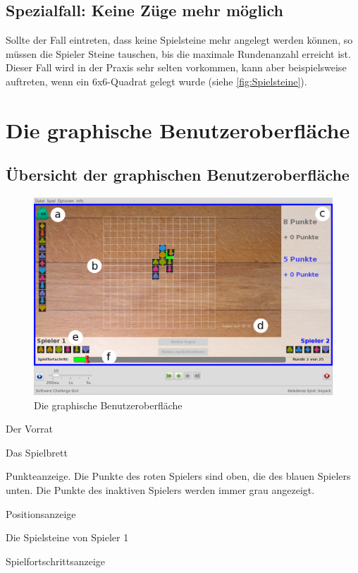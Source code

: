 \documentclass[a4paper, ngerman]{scrartcl}
\begin{document}
\subsection{Spezialfall: Keine Züge mehr möglich}
Sollte der Fall eintreten, dass keine Spielsteine mehr angelegt werden können, so müssen die Spieler Steine tauschen, bis die maximale Rundenanzahl erreicht ist. Dieser Fall wird in der Praxis sehr selten vorkommen, kann aber beispielsweise auftreten, wenn ein 6x6-Quadrat gelegt wurde (siehe \autoref{fig:Spielsteine}).
\newpage
	
\section{Die graphische Benutzeroberfläche}
\subsection{Übersicht der graphischen Benutzeroberfläche}
\begin{figure}[h]
	\centering
	\includegraphics[width = \textwidth]{images/GUI}
	\caption{Die graphische Benutzeroberfläche}
\end{figure}
\begin{compactenum}[a)]
	\item Der Vorrat
	\item Das Spielbrett
	\item Punkteanzeige. Die Punkte des roten Spielers sind
	oben, die des blauen Spielers unten. Die Punkte des inaktiven Spielers werden immer grau angezeigt.
	\item Positionsanzeige
	\item Die Spielsteine von Spieler 1
	\item Spielfortschrittsanzeige
\end{compactenum}
	
\end{document}
